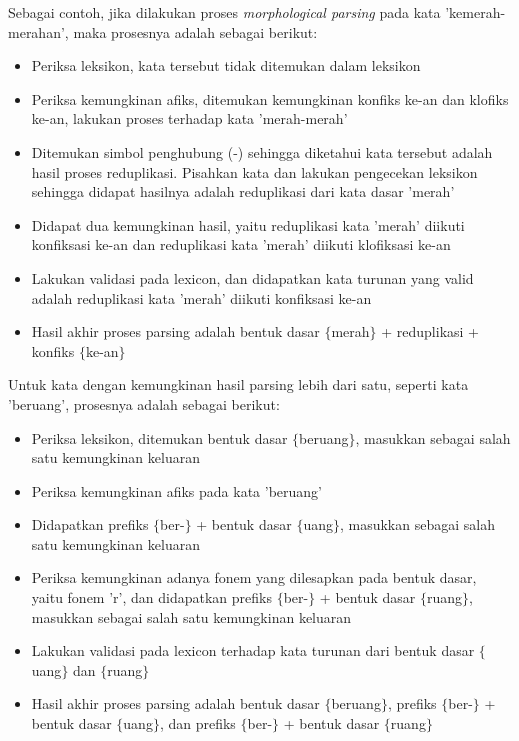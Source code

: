 Sebagai contoh, jika dilakukan proses \textit{morphological parsing} pada kata 'kemerah-merahan', maka prosesnya adalah sebagai berikut:
\begin{itemize}
	\item Periksa leksikon, kata tersebut tidak ditemukan dalam leksikon
	\item Periksa kemungkinan afiks, ditemukan kemungkinan konfiks {ke-an} dan klofiks {ke-an}, lakukan proses terhadap kata 'merah-merah'
	\item Ditemukan simbol penghubung (-) sehingga diketahui kata tersebut adalah hasil proses reduplikasi. Pisahkan kata dan lakukan pengecekan leksikon sehingga didapat hasilnya adalah reduplikasi dari kata dasar 'merah'
	\item Didapat dua kemungkinan hasil, yaitu reduplikasi kata 'merah' diikuti konfiksasi {ke-an} dan reduplikasi kata 'merah' diikuti klofiksasi {ke-an}
	\item Lakukan validasi pada lexicon, dan didapatkan kata turunan yang valid adalah reduplikasi kata 'merah' diikuti konfiksasi {ke-an}
	\item Hasil akhir proses parsing adalah bentuk dasar $\lbrace$merah$\rbrace$ + reduplikasi + konfiks $\lbrace$ke-an$\rbrace$
\end{itemize}


Untuk kata dengan kemungkinan hasil parsing lebih dari satu, seperti kata 'beruang', prosesnya adalah sebagai berikut:
\begin{itemize}
	\item Periksa leksikon, ditemukan bentuk dasar $\lbrace$beruang$\rbrace$, masukkan sebagai salah satu kemungkinan keluaran
	\item Periksa kemungkinan afiks pada kata 'beruang'
	\item Didapatkan prefiks $\lbrace$ber-$\rbrace$ + bentuk dasar $\lbrace$uang$\rbrace$, masukkan sebagai salah satu kemungkinan keluaran
	\item Periksa kemungkinan adanya fonem yang dilesapkan pada bentuk dasar, yaitu fonem 'r', dan didapatkan prefiks $\lbrace$ber-$\rbrace$ + bentuk dasar $\lbrace$ruang$\rbrace$, masukkan sebagai salah satu kemungkinan keluaran
	\item Lakukan validasi pada lexicon terhadap kata turunan dari bentuk dasar $\lbrace$uang$\rbrace$ dan $\lbrace$ruang$\rbrace$
	\item Hasil akhir proses parsing adalah bentuk dasar $\lbrace$beruang$\rbrace$, prefiks $\lbrace$ber-$\rbrace$ + bentuk dasar $\lbrace$uang$\rbrace$, dan prefiks $\lbrace$ber-$\rbrace$ + bentuk dasar $\lbrace$ruang$\rbrace$
\end{itemize}

